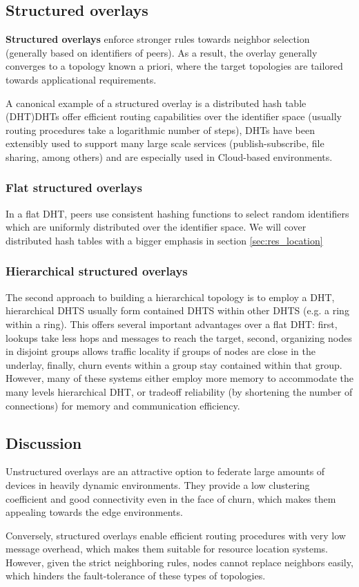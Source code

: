 \subsection{Structured overlays} 

\textbf{Structured overlays} enforce stronger rules towards neighbor selection (generally based on identifiers of peers). As a result, the overlay generally converges to a topology known a priori, where the target topologies are tailored towards applicational requirements. 

A canonical example of a structured overlay is a distributed hash table (DHT)DHTs offer efficient routing capabilities over the identifier space (usually routing procedures take a logarithmic number of steps), DHTs have been extensibly used to support many large scale services (publish-subscribe, file sharing, among others) and are especially used in Cloud-based environments. 

\subsubsection{Flat structured overlays}

In a flat DHT, peers use consistent hashing functions to select random identifiers which are uniformly distributed over the identifier space. We will cover distributed hash tables with a bigger emphasis in section \ref{sec:res_location}

\subsubsection{Hierarchical structured overlays}

The second approach to building a hierarchical topology is to employ a DHT, hierarchical DHTS usually form contained DHTS within other DHTS (e.g. a ring within a ring). This offers several important advantages over a flat DHT: first, lookups take less hops and messages to reach the target, second, organizing nodes in disjoint groups allows traffic locality if groups of nodes are close in the underlay, finally, churn events within a group stay contained within that group. However, many of these systems either employ more memory to accommodate the many levels hierarchical DHT, or tradeoff reliability (by shortening the number of connections) for memory and communication efficiency.

\subsection{Discussion}

Unstructured overlays are an attractive option to federate large amounts of devices in heavily dynamic environments. They provide a low clustering coefficient and good connectivity even in the face of churn, which makes them appealing towards the edge environments. 

Conversely, structured overlays enable efficient routing procedures with very low message overhead, which makes them suitable for resource location systems. However, given the strict neighboring rules, nodes cannot replace neighbors easily, which hinders the fault-tolerance of these types of topologies.